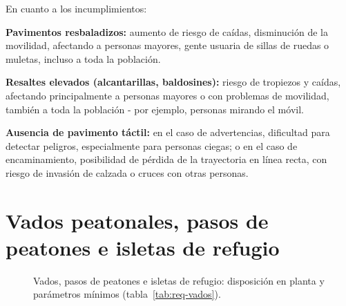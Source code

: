 En cuanto a los incumplimientos:
\begin{inconvenientes}
  \item \textbf{Pavimentos resbaladizos:} aumento de riesgo de caídas, disminución de la movilidad, afectando a personas mayores, gente usuaria de sillas de ruedas o muletas, incluso a toda la población.
  \item \textbf{Resaltes elevados (alcantarillas, baldosines):} riesgo de tropiezos y caídas, afectando principalmente a personas mayores o con problemas de movilidad, también a toda la población - por ejemplo, personas mirando el móvil.
  \item \textbf{Ausencia de pavimento táctil:} en el caso de advertencias, dificultad para detectar peligros, especialmente para personas ciegas; o en el caso de encaminamiento, posibilidad de pérdida de la trayectoria en línea recta, con riesgo de invasión de calzada o cruces con otras personas.
\end{inconvenientes}

\section{Vados peatonales, pasos de peatones e isletas de refugio}

\begin{figure}[htbp]
\centering

\caption{Vados, pasos de peatones e isletas de refugio: disposición en planta y parámetros
  mínimos (tabla~\ref{tab:req-vados}).}
\label{fig:vados}
\end{figure}

